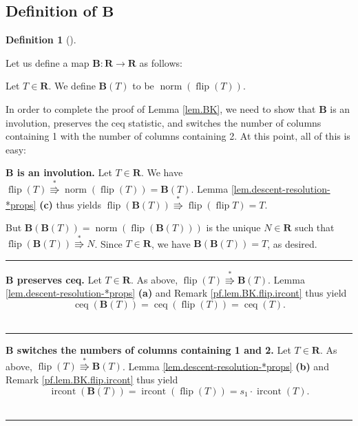 \documentclass[numbers=enddot,12pt,final,onecolumn,notitlepage]{scrartcl}%
\theoremstyle{definition}
\newtheorem{defi}[theo]{Definition}
\newenvironment{definition}[1][]
{\begin{defi}[#1]\begin{leftbar}}
{\end{leftbar}\end{defi}}
\newenvironment{proof}[1][Proof]{\noindent\textbf{#1.} }{\ \rule{0.5em}{0.5em}}
\begin{document}
\subsection{Definition of $\mathbf{B}$}

\begin{definition}
Let us define a map $\mathbf{B}:\mathbf{R}\rightarrow\mathbf{R}$ as follows:

Let $T\in\mathbf{R}$. We define $\mathbf{B}\left(
T\right)  $ to be $\operatorname*{norm}\left(  \operatorname*{flip}\left(
T\right)  \right)  $.
\end{definition}

In order to complete the proof of Lemma
\ref{lem.BK}, we need to show that $\mathbf{B}$ is an involution, preserves the ceq statistic, and switches the number of columns containing 1 with the number of columns containing 2. At this point, all of this is easy:

\begin{proof}[$\mathbf{B}$ is an involution]
Let $T\in \mathbf{R}$. We have $\operatorname*{flip}\left(
T\right)  \overset{\ast}{\Rrightarrow}\operatorname*{norm}\left(
\operatorname*{flip}\left(  T\right)  \right)  =
\mathbf{B}\left(  T\right)  $. Lemma \ref{lem.descent-resolution-*props} \textbf{(c)} thus yields $\operatorname*{flip}\left(  \mathbf{B}\left(  T\right)
\right)  \overset{\ast}{\Rrightarrow}\operatorname*{flip}\left(
\operatorname*{flip}T\right)  = T$.

But $\mathbf{B}(\mathbf{B}(T)) = \operatorname*{norm}\left(  \operatorname*{flip}\left(
\mathbf{B}\left(  T\right)  \right)  \right)  $ is the unique $N\in\mathbf{R}$
such that $\operatorname*{flip}\left(  \mathbf{B}\left(  T\right)  \right)
\overset{\ast}{\Rrightarrow}N$. Since $T \in \mathbf{R}$, we have $\mathbf{B}(\mathbf{B}(T)) = T$, as desired.
\end{proof}

\begin{proof}[$\mathbf{B}$ preserves ceq]
Let $T\in\mathbf{R}$. As above, $\operatorname*{flip}\left(  T\right)  \overset{\ast
}{\Rrightarrow}\mathbf{B}\left(  T\right)  $. Lemma \ref{lem.descent-resolution-*props} \textbf{(a)} and Remark \ref{pf.lem.BK.flip.ircont} thus yield
\[
\operatorname*{ceq}\left(  \mathbf{B}\left(  T\right)  \right)
=\operatorname*{ceq}\left(  \operatorname*{flip}\left(  T\right)  \right)
=\operatorname*{ceq}\left(  T\right).
\]
\end{proof}

\begin{proof}[$\mathbf{B}$ switches the numbers of columns containing 1 and 2]
Let $T\in\mathbf{R}$. As above, $\operatorname*{flip}\left(  T\right)  \overset{\ast
}{\Rrightarrow}\mathbf{B}\left(  T\right)  $. Lemma \ref{lem.descent-resolution-*props} \textbf{(b)}
and Remark \ref{pf.lem.BK.flip.ircont} thus yield
\[
\operatorname*{ircont}\left(  \mathbf{B}\left(  T\right)  \right)
=\operatorname*{ircont}\left(  \operatorname*{flip}\left(  T\right)  \right)
=s_{1}\cdot\operatorname*{ircont}\left(  T\right).
\]
\end{proof}
\end{document}
